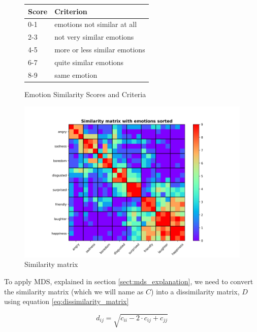 \documentclass[11pt, a4paper]{article}
\numberwithin{equation}{subsection}
\begin{document}
\begin{figure}[ht]
    \begin{minipage}{0.5\textwidth}
        \centering
        \begin{tabular}{l|l}
        \textbf{Score} & \textbf{Criterion}                   \\ \hline
        0-1            & emotions not similar at all         \\
        2-3            & not very similar emotions           \\
        4-5            & more or less similar emotions       \\
        6-7            & quite similar emotions              \\
        8-9            & same emotion                        
    \end{tabular}
    \captionsetup{type=table}
    \caption{Emotion Similarity Scores and Criteria}
    \label{tab:rank_criterion}
  \end{minipage}
  \begin{minipage}{0.5\textwidth}
    \centering
    \includegraphics[width=\linewidth]{images/sim_matrix_sorted.png}
    \caption{Similarity matrix}
    \label{fig:sim_matrix}
  \end{minipage}%
  
\end{figure}

To apply MDS, explained in section \ref{sect:mds_explanation}, we need to convert the similarity matrix (which we will name as $C$) into a dissimilarity matrix, $D$ using equation \eqref{eq:dissimilarity_matrix}

 \begin{equation}\label{eq:dissimilarity_matrix}
     d_{ij} = \sqrt{c_{ii} - 2\cdot c_{ij} + c_{jj}}
 \end{equation}
\end{document}
